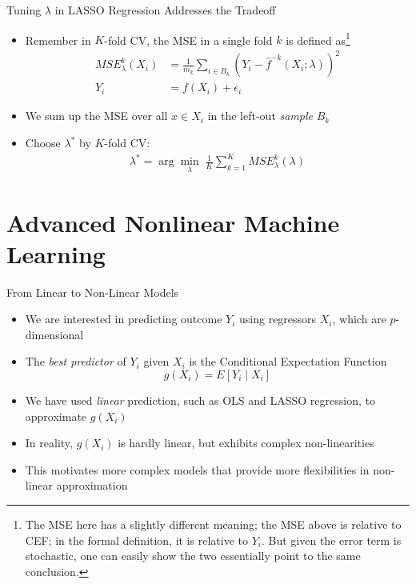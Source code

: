 \documentclass[aspectratio=1610,12pt,xcolor=dvipsnames]{beamer}
\begin{document}
\begin{frame}{Tuning $\lambda$ in LASSO Regression Addresses the Tradeoff}
\begin{itemize}
  \item Remember in $K$-fold CV, the MSE in a single fold $k$ is defined as\footnote{The MSE here has a slightly different meaning; the MSE above is relative to CEF; in the formal definition, it is relative to $Y_i$. But given the error term is stochastic, one can easily show the two essentially point to the same conclusion.}
  \begin{align*}
      MSE_{\lambda}^{k}(X_i) &= \frac{1}{m_k} \sum_{i \in B_k} \left( Y_i - \hat f^{-k}(X_i;\lambda) \right)^2 \\
      Y_i &= f(X_i) + \epsilon_i
  \end{align*}
  \item We sum up the MSE over all $x \in X_i$ in the left-out \textit{sample} $B_k$
  \item Choose \(\lambda^\ast\) by \(K\)-fold CV:
  \begin{align*}
  \lambda^\ast=\arg\min_{\lambda}\;\frac{1}{K}\sum_{k=1}^K MSE_{\lambda}^{k}(\lambda)
  \end{align*}
\end{itemize}
\end{frame}

\section{Advanced Nonlinear Machine Learning}

\begin{frame}
  \sectionpage
\end{frame}

\begin{frame}{From Linear to Non-Linear Models}

\begin{itemize}
    \item We are interested in predicting outcome $Y_i$ using regressors $X_i$, which are $p$-dimensional
    \item The \textit{best predictor} of $Y_i$ given $X_i$ is the Conditional Expectation Function
    \[
    g(X_i) = E[Y_i \mid X_i]
    \]
    \item We have used \textit{linear} prediction, such as OLS and LASSO regression, to approximate $g(X_i)$
    \item In reality, $g(X_i)$ is hardly linear, but exhibits complex non-linearities
    \item This motivates more complex models that provide more flexibilities in non-linear approximation
\end{itemize}
\end{frame}
\end{document}
